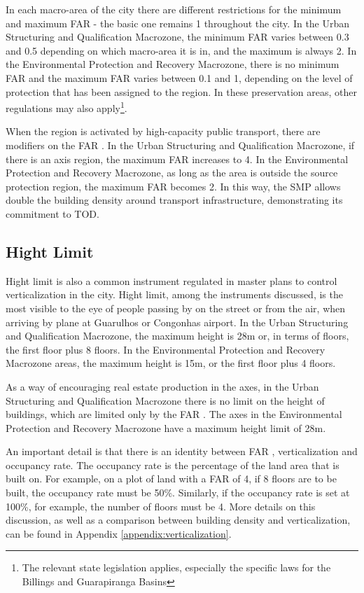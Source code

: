 In each macro-area of the city there are different restrictions for the minimum and maximum FAR - the basic one remains 1 throughout the city. In the Urban Structuring and Qualification Macrozone, the minimum FAR varies between 0.3 and 0.5 depending on which macro-area it is in, and the maximum is always 2. In the Environmental Protection and Recovery Macrozone, there is no minimum FAR and the maximum FAR varies between 0.1 and 1, depending on the level of protection that has been assigned to the region. In these preservation areas, other regulations may also apply\footnote{The relevant state legislation applies, especially the specific laws for the Billings and Guarapiranga Basins}.

When the region is activated by high-capacity public transport, there are modifiers on the FAR . In the Urban Structuring and Qualification Macrozone, if there is an axis region, the maximum FAR increases to 4. In the Environmental Protection and Recovery Macrozone, as long as the area is outside the source protection region, the maximum FAR becomes 2. In this way, the SMP allows double the building density around transport infrastructure, demonstrating its commitment to TOD.

\subsection*{Hight Limit}

Hight limit is also a common instrument regulated in master plans to control verticalization in the city. Hight limit, among the instruments discussed, is the most visible to the eye of people passing by on the street or from the air, when arriving by plane at Guarulhos or Congonhas airport. In the Urban Structuring and Qualification Macrozone, the maximum height is 28m or, in terms of floors, the first floor plus 8 floors. In the Environmental Protection and Recovery Macrozone areas, the maximum height is 15m, or the first floor plus 4 floors.

As a way of encouraging real estate production in the axes, in the Urban Structuring and Qualification Macrozone there is no limit on the height of buildings, which are limited only by the FAR . The axes in the Environmental Protection and Recovery Macrozone have a maximum height limit of 28m.

An important detail is that there is an identity between FAR , verticalization and occupancy rate. The occupancy rate is the percentage of the land area that is built on. For example, on a plot of land with a FAR of 4, if 8 floors are to be built, the occupancy rate must be 50\%. Similarly, if the occupancy rate is set at 100\%, for example, the number of floors must be 4. More details on this discussion, as well as a comparison between building density and verticalization, can be found in Appendix \ref{appendix:verticalization}.

